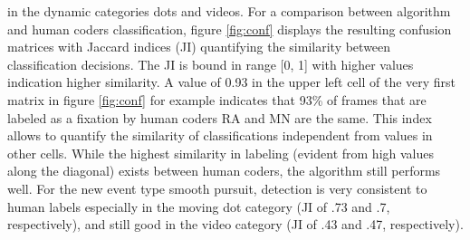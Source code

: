 \citet{Andersson2017} in the dynamic categories dots and videos. For a comparison between algorithm and human
coders classification, figure \ref{fig:conf} displays the resulting
confusion matrices with Jaccard indices (JI) quantifying the similarity between classification decisions. The
JI is bound in range [0, 1] with higher values indication higher similarity. A value of 0.93 in the upper
left cell of the very first matrix in figure \ref{fig:conf} for example indicates that 93\% of frames that are
labeled as a fixation by human coders RA and MN are the same. This index allows to quantify the similarity of
classifications independent from values in other cells. While the highest similarity in labeling (evident from
high values along the diagonal) exists between human coders, the algorithm still performs well. For the new event
type smooth pursuit, detection is very consistent to human labels especially in the moving dot category (JI of
.73 and .7, respectively), and still good in the video category (JI of .43 and .47, respectively).\\

